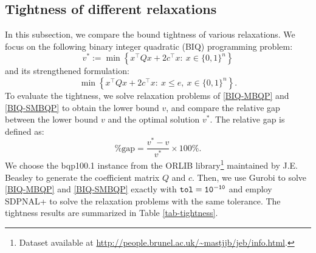 \documentclass[11pt]{article}
\theoremstyle{plain}
\def\tol{\tt{tol}}
\begin{document}

\subsection{Tightness of different relaxations}\label{subsec-tightness-numerical}

In this subsection, we compare the bound tightness of various relaxations. We focus on the following binary integer quadratic (BIQ) programming problem:
%
\begin{equation}\label{BIQ-MBQP}
v^*:=\min\left\{x^{\top} Q x+2 c^{\top}x:\  x \in\{0,1\}^n\right\}\tag{BIQ}
\end{equation}
%
and its strengthened formulation:
%
\begin{equation}\label{BIQ-SMBQP}
\min\left\{x^{\top} Q x+2 c^{\top}x:\ x\leq e,\ x \in\{0,1\}^n\right\}.\tag{BIQ-S}
\end{equation}
%
To evaluate the tightness, we solve relaxation problems of \eqref{BIQ-MBQP} and \eqref{BIQ-SMBQP} to obtain the lower bound $v$, and compare the relative gap between the lower bound $v$ and the optimal solution $v^*$. The relative gap is defined as:
%
\begin{equation*}
    \%\text{gap} = \frac{v^* - v}{v^*} \times 100\%.
\end{equation*}
%
We choose the bqp100.1 instance from the ORLIB library\footnote{Dataset available at \url{http://people.brunel.ac.uk/~mastjjb/jeb/info.html}.} maintained by J.E. Beasley to generate the coefficient matrix $Q$ and $c$. Then, we use Gurobi \cite{gurobi} to solve \eqref{BIQ-MBQP} and \eqref{BIQ-SMBQP} exactly with $\tol=10^{-10}$ and employ SDPNAL+ to solve the relaxation problems with the same tolerance. The tightness results are summarized in Table \ref{tab-tightness}.
%
\end{document}
